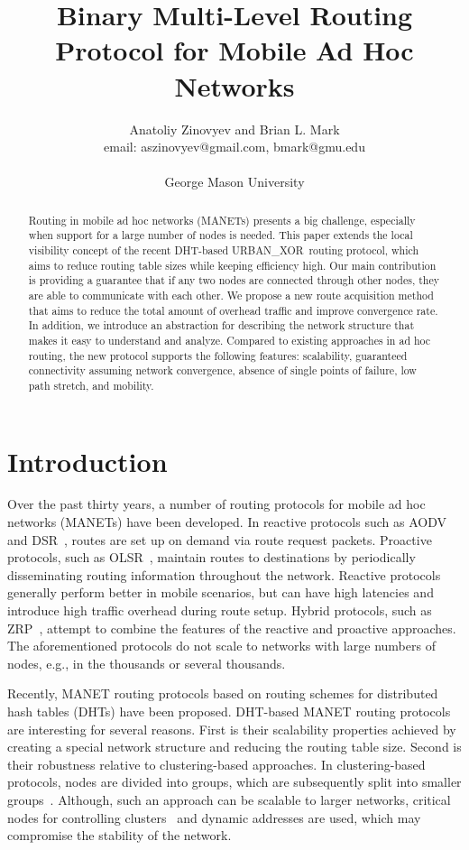 \documentclass[conference]{IEEEtran}
\title{Binary Multi-Level Routing Protocol for Mobile Ad Hoc Networks}
\author{
  Anatoliy Zinovyev and Brian L. Mark \\
  email: aszinovyev@gmail.com, bmark@gmu.edu \\
   \\
  George Mason University \\
}
\theoremstyle{definition}
\newcommand{\urbanxor}{URBAN\_XOR}
\begin{document}
\maketitle

\begin{abstract}
Routing in mobile ad hoc networks (MANETs) presents a big challenge, especially when support for a large number of nodes is needed. This paper extends the local visibility concept of the recent DHT-based \urbanxor~routing protocol, which aims to reduce routing table sizes while keeping efficiency high. Our main contribution is providing a guarantee that if any two nodes are connected through other nodes, they are able to communicate with each other. We propose a new route acquisition method that aims to reduce the total amount of overhead traffic and improve convergence rate. In addition, we introduce an abstraction for describing the network structure that makes it easy to understand and analyze. Compared to existing approaches in ad hoc routing, the new protocol supports the following features: scalability, guaranteed connectivity assuming network convergence, absence of single points of failure, low path stretch, and mobility.
\end{abstract}



\section{Introduction}
\label{sec:introduction}

Over the past thirty years, a number of routing protocols for mobile ad hoc networks (MANETs) have been developed.
In reactive protocols such as AODV~\cite{aodv} and DSR~\cite{dsr}, routes are set up  on demand via route request packets.  Proactive protocols, such as OLSR~\cite{olsr}, maintain routes to destinations by periodically disseminating routing information throughout the network. Reactive protocols generally perform better in mobile scenarios, but can have high latencies and introduce high traffic overhead during route setup.  Hybrid protocols, such as ZRP~\cite{zrp}, attempt to combine the features of the reactive and proactive approaches.  The aforementioned protocols do not scale to networks with large numbers of nodes, e.g., in the thousands or several thousands. 
  
Recently, MANET routing protocols based on routing schemes for distributed hash tables (DHTs) have been proposed.  DHT-based MANET routing protocols  are interesting for several reasons. First is their scalability properties achieved by creating a special network structure and reducing the routing table size. Second is their robustness relative to clustering-based approaches. In clustering-based protocols, nodes are divided into groups, which are subsequently split into smaller groups~\cite{Hong}. Although, such an approach can be scalable to larger networks, critical nodes for controlling clusters~\cite{Hong} and dynamic addresses \cite{Hong,dart,ntk} are used, which may compromise the stability of the network.
\end{document}
